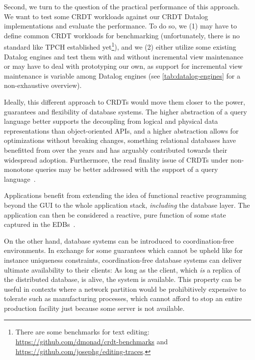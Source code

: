 \documentclass{article}
\begin{document}
Second, we turn to the question of the practical performance of this approach.
We want to test some CRDT workloads against our CRDT Datalog implementations and
evaluate the performance.
To do so, we (1) may have to define common CRDT workloads for benchmarking
(unfortunately, there is no standard like TPCH established yet\footnote{
    There are some benchmarks for text editing:
    \url{https://github.com/dmonad/crdt-benchmarks} and
    \url{https://github.com/josephg/editing-traces}.
}), and we (2) either utilize some existing Datalog engines and test them
with and without incremental view maintenance or may have to deal with
prototyping our own, as support for incremental view maintenance is variable
among Datalog engines
(see \autoref{tab:datalog-engines} for a non-exhaustive overview).

Ideally, this different approach to CRDTs would move them closer to the power,
guarantees and flexibility of database systems.
The higher abstraction of a query language better supports the decoupling from
logical and physical data representations than object-oriented APIs,
and a higher abstraction allows for optimizations without breaking changes,
something relational databases have benefitted from over the years and has
arguably contributed towards their widespread adoption.
Furthermore, the read finality issue of CRDTs under non-monotone queries
may be better addressed with the support of a query language~\cite{laddad2022keep}.

Applications benefit from extending the idea of functional reactive programming
beyond the GUI to the whole application stack,
\emph{including} the database layer.
The application can then be considered a reactive, pure function
of some state captured in the EDBs~\cite{schiefer2022building}.

On the other hand, database systems can be introduced to coordination-free
environments.
In exchange for some guarantees which cannot be upheld
like for instance uniqueness constraints,
coordination-free database systems can deliver ultimate availability
to their clients:
As long as the client, which \emph{is} a replica of the distributed database,
is alive, the system is available.
This property can be useful in contexts where a network partition would be
prohibitively expensive to tolerate such as manufacturing processes,
which cannot afford to stop an entire production facility just because
some server is not available.
\end{document}
